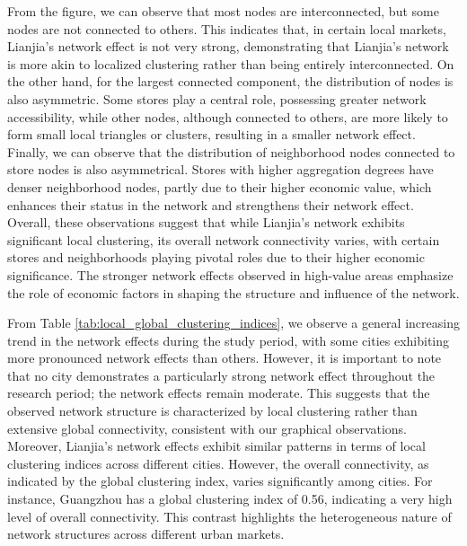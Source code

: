 \documentclass[11pt]{article}
\begin{document}
From the figure, we can observe that most nodes are interconnected, but some nodes are not connected to others. This indicates that, in certain local markets, Lianjia's network effect is not very strong, demonstrating that Lianjia's network is more akin to localized clustering rather than being entirely interconnected. On the other hand, for the largest connected component, the distribution of nodes is also asymmetric. Some stores play a central role, possessing greater network accessibility, while other nodes, although connected to others, are more likely to form small local triangles or clusters, resulting in a smaller network effect. Finally, we can observe that the distribution of neighborhood nodes connected to store nodes is also asymmetrical. Stores with higher aggregation degrees have denser neighborhood nodes, partly due to their higher economic value, which enhances their status in the network and strengthens their network effect. Overall, these observations suggest that while Lianjia's network exhibits significant local clustering, its overall network connectivity varies, with certain stores and neighborhoods playing pivotal roles due to their higher economic significance. The stronger network effects observed in high-value areas emphasize the role of economic factors in shaping the structure and influence of the network.

From Table \ref{tab:local_global_clustering_indices}, we observe a general increasing trend in the network effects during the study period, with some cities exhibiting more pronounced network effects than others. However, it is important to note that no city demonstrates a particularly strong network effect throughout the research period; the network effects remain moderate. This suggests that the observed network structure is characterized by local clustering rather than extensive global connectivity, consistent with our graphical observations. Moreover, Lianjia's network effects exhibit similar patterns in terms of local clustering indices across different cities. However, the overall connectivity, as indicated by the global clustering index, varies significantly among cities. For instance, Guangzhou has a global clustering index of 0.56, indicating a very high level of overall connectivity. This contrast highlights the heterogeneous nature of network structures across different urban markets. 
\end{document}
